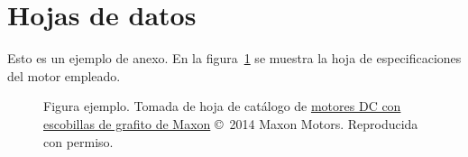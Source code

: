 \section{Hojas de datos}
\label{sec:hojas-datos}

Esto es un ejemplo de anexo. En la figura~\ref{fig:hoja-datos} se muestra la hoja de especificaciones del motor empleado.

\begin{figure}[ht!]
\centering
{}
\caption{Figura ejemplo. Tomada de hoja de catálogo de \href{https://www.maxonmotor.com/medias/sys_master/root/8830469472286/2018EN-129.pdf}{motores DC con escobillas de grafito de Maxon} \copyright~2014 Maxon Motors. Reproducida con permiso.}
\label{fig:hoja-datos}
\end{figure}